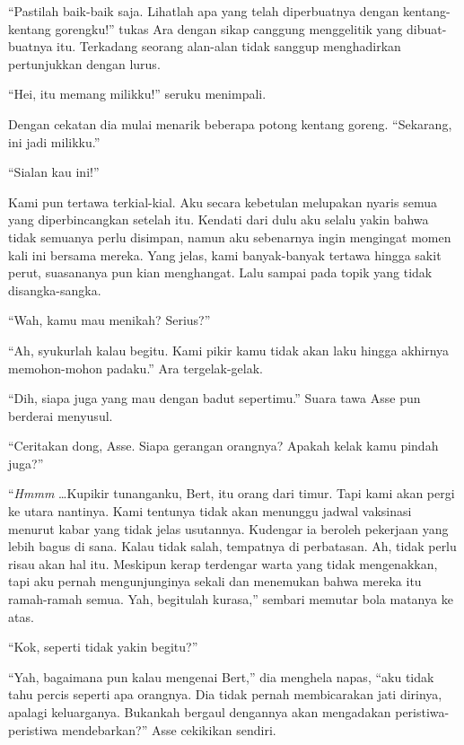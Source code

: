 \documentclass[smalldemyvopaper,11pt,twoside,onecolumn,openright,extrafontsizes]{memoir}
\begin{document}
``Pastilah baik-baik saja. Lihatlah apa yang telah diperbuatnya dengan kentang-kentang gorengku!'' tukas Ara dengan sikap canggung menggelitik yang dibuat-buatnya itu. Terkadang seorang alan-alan tidak sanggup menghadirkan pertunjukkan dengan lurus.

``Hei, itu memang milikku!'' seruku menimpali.

Dengan cekatan dia mulai menarik beberapa potong kentang goreng. ``Sekarang, ini jadi milikku.''

``Sialan kau ini!''


Kami pun tertawa terkial-kial. Aku secara kebetulan melupakan nyaris semua yang diperbincangkan setelah itu. Kendati dari dulu aku selalu yakin bahwa tidak semuanya perlu disimpan, namun aku sebenarnya ingin mengingat momen kali ini bersama mereka. Yang jelas, kami banyak-banyak tertawa hingga sakit perut, suasananya pun kian menghangat. Lalu sampai pada topik yang tidak disangka-sangka.

``Wah, kamu mau menikah? Serius?''

``Ah, syukurlah kalau begitu. Kami pikir kamu tidak akan laku hingga akhirnya memohon-mohon padaku.'' Ara tergelak-gelak.

``Dih, siapa juga yang mau dengan badut sepertimu.'' Suara tawa Asse pun berderai menyusul.


``Ceritakan dong, Asse. Siapa gerangan orangnya? Apakah kelak kamu pindah juga?''


``\textit{Hmmm} \dots Kupikir tunanganku, Bert, itu orang dari timur. Tapi kami akan pergi ke utara nantinya. Kami tentunya tidak akan menunggu jadwal vaksinasi menurut kabar yang tidak jelas usutannya. Kudengar ia beroleh pekerjaan yang lebih bagus di sana. Kalau tidak salah, tempatnya di perbatasan. Ah, tidak perlu risau akan hal itu. Meskipun kerap terdengar warta yang tidak mengenakkan, tapi aku pernah mengunjunginya sekali dan menemukan bahwa mereka itu ramah-ramah semua. Yah, begitulah kurasa,'' sembari memutar bola matanya ke atas.

``Kok, seperti tidak yakin begitu?''


``Yah, bagaimana pun kalau mengenai Bert,'' dia menghela napas, ``aku tidak tahu percis seperti apa orangnya. Dia tidak pernah membicarakan jati dirinya, apalagi keluarganya. Bukankah bergaul dengannya akan mengadakan peristiwa-peristiwa mendebarkan?'' Asse cekikikan sendiri.
\end{document}
